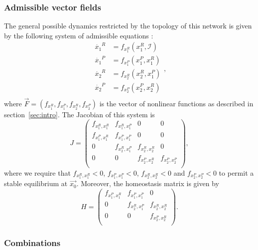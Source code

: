 \subsubsection{Admissible vector fields}

The general possible dynamics restricted by
the topology of this network is given by the following system of 
admissible equations \cite{martin_ian_groupoids2006}:
\begin{equation}
    \begin{aligned}
        \dot{x_1}^R &= f_{x_1^R}(x_1^R, \mathcal{I})\\
        \dot{x_1}^P &= f_{x_1^P}(x_1^P, x_1^R)\\
        \dot{x_2}^R &= f_{x_2^R}(x_2^R, x_1^P)\\
        \dot{x_2}^P &= f_{x_2^P}(x_2^P, x_2^R)\\
    \end{aligned},
\end{equation} 
where $\vec{F} = (f_{x_1^R}, f_{x_1^P}, f_{x_2^R}, f_{x_2^P})$ is 
the vector of nonlinear functions as described in 
section~\ref{sec:intro}. The Jacobian of this system is 
\begin{equation}
    J = 
    \begin{pmatrix}
        f_{x_1^R,x_1^R} & f_{x_1^R, x_1^P} & 0 & 0 \\
        f_{x_1^P,x_1^R} & f_{x_1^P,x_1^P} & 0 & 0 \\
        0 & f_{x_2^R,x_1^P} & f_{x_2^R,x_2^R} & 0 \\
        0 & 0 & f_{x_2^P,x_2^R} & f_{x_2^P,x_2^P} \\
    \end{pmatrix},
\end{equation} 
where we require that $f_{x_1^R, x_1^R} < 0$, $f_{x_1^P, x_1^P} < 0$, 
$f_{x_2^R, x_2^R} < 0$ and $f_{x_2^P, x_2^P} < 0$ to permit a 
stable equilibrium at $\vec{x_0}$. Moreover, the homeostasis matrix
is given by
\begin{equation}
    H = 
    \begin{pmatrix}
        f_{x_1^P,x_1^R} & f_{x_1^P,x_1^P} & 0 \\
        0 & f_{x_2^R,x_1^P} & f_{x_2^R,x_2^R} \\
        0 & 0 & f_{x_2^P,x_2^R} \\
    \end{pmatrix}.
\end{equation} 

\subsubsection{Combinations}

